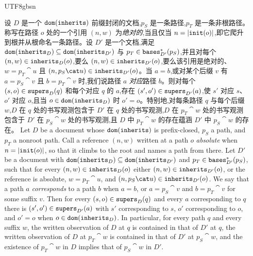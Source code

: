 \begin{CJK*}{UTF8}{gbsn}
\begin{lemma}\label{lem:redirection-simulation}
\ifPaperChinese
设 $D$ 是一个 $\mathtt{dom}(\mathtt{inherits})$ 前缀封闭的文档,$p_S$ 是一条路径,$p_T$ 是一条非根路径。称写在路径 $o$ 处的一个引用 $(n, w)$ 为\emph{绝对的},当且仅当 $n = |\mathtt{init}(o)|$,即它爬升到根并从根命名一条路径。设 $D'$ 是一个文档,满足 $\mathtt{dom}(\mathtt{inherits}_D) \subseteq \mathtt{dom}(\mathtt{inherits}_{D'})$ 与 $p_T \in \mathtt{bases}^*_{D'}(p_S)$,并且对每个 $(n, w) \in \mathtt{inherits}_D(o)$,要么 $(n, w) \in \mathtt{inherits}_{D'}(o)$,要么该引用是绝对的、$w = p_T \cat u$ 且 $(n, p_S \cat u) \in \inherits_{D'}(o)$。当 $a = b$,或对某个后缀 $v$ 有 $a = p_S \cat v$ 且 $b = p_T \cat v$ 时,我们说路径 $a$ \emph{对应}路径 $b$。则对每个 $(s, o) \in \mathtt{supers}_D(q)$ 和每个对应 $q$ 的 $a$,存在 $(s', o') \in \mathtt{supers}_{D'}(a)$,使 $s'$ 对应 $s$、$o'$ 对应 $o$,且当 $o \in \mathtt{dom}(\mathtt{inherits}_D)$ 时 $o' = o$。特别地,对每条路径 $q$ 与每个后缀 $w$,$D$ 在 $q$ 处的书写观测包含于 $D'$ 在 $q$ 处的书写观测,$D$ 在 $p_T \cat w$ 处的书写观测包含于 $D'$ 在 $p_S \cat w$ 处的书写观测,且 $D$ 中 $p_T \cat w$ 的存在蕴涵 $D'$ 中 $p_S \cat w$ 的存在。
\else
Let $D$ be a document whose $\mathtt{dom}(\mathtt{inherits})$ is prefix-closed, $p_S$ a path, and $p_T$ a nonroot path.
Call a reference $(n, w)$ written at a path $o$ \emph{absolute} when $n = |\mathtt{init}(o)|$, so that it climbs
to the root and names a path from there. Let $D'$ be a document with
$\mathtt{dom}(\mathtt{inherits}_D) \subseteq \mathtt{dom}(\mathtt{inherits}_{D'})$ and $p_T \in \mathtt{bases}^*_{D'}(p_S)$, such that for every
$(n, w) \in \mathtt{inherits}_D(o)$ either $(n, w) \in \mathtt{inherits}_{D'}(o)$, or the reference is absolute,
$w = p_T \cat u$, and $(n, p_S \cat u) \in \inherits_{D'}(o)$. We say that a path $a$
\emph{corresponds} to a path $b$ when $a = b$, or $a = p_S \cat v$ and $b = p_T \cat v$ for some suffix
$v$. Then for every $(s, o) \in \mathtt{supers}_D(q)$ and every $a$ corresponding to $q$ there is
$(s', o') \in \mathtt{supers}_{D'}(a)$ with $s'$ corresponding to $s$, $o'$ corresponding to $o$, and
$o' = o$ when $o \in \mathtt{dom}(\mathtt{inherits}_D)$. In particular, for every path $q$ and every suffix $w$, the
written observation of $D$ at $q$ is contained in that of $D'$ at $q$, the written observation of $D$ at
$p_T \cat w$ is contained in that of $D'$ at $p_S \cat w$, and the existence of $p_T \cat w$ in $D$ implies that of $p_S \cat w$ in
$D'$.
\fi
\end{lemma}


\end{CJK*}
